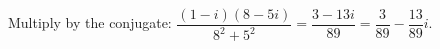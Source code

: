 Multiply by the conjugate: $\dfrac{(1-i)(8-5i)}{8^2+5^2}=\dfrac{3-13i}{89}=\boxed{\dfrac{3}{89}-\dfrac{13}{89}i}$.

